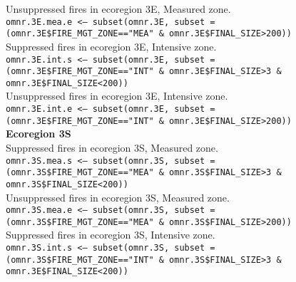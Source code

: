 \begin{spacing}{1.5}
\noindent Unsuppressed fires in ecoregion 3E, Measured zone. \\

\noindent \texttt{omnr.3E.mea.e <-- subset(omnr.3E, subset = (omnr.3E\$FIRE\_MGT\_ZONE==\linebreak "MEA" \& omnr.3E\$FINAL\_SIZE>200))} \\

\noindent Suppressed fires in ecoregion 3E, Intensive zone. \\

\noindent \texttt{omnr.3E.int.s <-- subset(omnr.3E, subset = (omnr.3E\$FIRE\_MGT\_ZONE==\linebreak "INT" \& omnr.3E\$FINAL\_SIZE>3 \& omnr.3E\$FINAL\_SIZE<200))} \\

\noindent Unsuppressed fires in ecoregion 3E, Intensive zone. \\

\noindent \texttt{omnr.3E.int.e <-- subset(omnr.3E, subset = (omnr.3E\$FIRE\_MGT\_ZONE==\linebreak "INT" \& omnr.3E\$FINAL\_SIZE>200))} \\

\noindent \textbf{Ecoregion 3S} \\

\noindent Suppressed fires in ecoregion 3S, Measured zone. \\

\noindent \texttt{omnr.3S.mea.s <-- subset(omnr.3S, subset = (omnr.3S\$FIRE\_MGT\_ZONE==\linebreak "MEA" \& omnr.3S\$FINAL\_SIZE>3 \& omnr.3S\$FINAL\_SIZE<200))} \\

\noindent Unsuppressed fires in ecoregion 3S, Measured zone. \\

\noindent \texttt{omnr.3S.mea.e <-- subset(omnr.3S, subset = (omnr.3S\$FIRE\_MGT\_ZONE==\linebreak "MEA" \& omnr.3S\$FINAL\_SIZE>200))} \\

\noindent Suppressed fires in ecoregion 3S, Intensive zone. \\

\noindent \texttt{omnr.3S.int.s <-- subset(omnr.3S, subset = (omnr.3S\$FIRE\_MGT\_ZONE==\linebreak "INT" \& omnr.3S\$FINAL\_SIZE>3 \& omnr.3E\$FINAL\_SIZE<200))} \\


\end{spacing}
